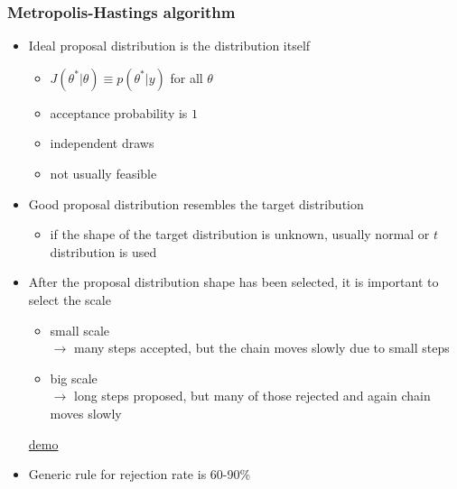 \documentclass[10pt]{beamer}
\begin{document}
\begin{frame}

\frametitle{ Metropolis-Hastings algorithm}

  \begin{itemize}
  \item Ideal proposal distribution is the distribution itself
    \begin{itemize}
    \item $J(\theta^{*}|\theta)\equiv p(\theta^{*}|y)$ for all
      $\theta$
    \item acceptance probability is $1$
    \item independent draws
    \item not usually feasible
    \end{itemize}
  \item<2-> Good proposal distribution resembles the target distribution
    \begin{itemize}
    \item if the shape of the target distribution is unknown, usually
      normal or $t$ distribution is used
    \end{itemize}
  \item<3-> After the proposal distribution shape has been selected, it is important to select the scale
    \begin{itemize}
    \item small scale \\$\rightarrow$ many steps accepted, but the chain moves slowly due to small steps
    \item big scale \\$\rightarrow$ long steps proposed, but many of
      those rejected and again chain moves slowly
    \end{itemize}
    \begin{center}
  \href{https://chi-feng.github.io/mcmc-demo/app.html?algorithm=RandomWalkMH&target=standard}{demo}
  \end{center}
  \item<4-> Generic rule for rejection rate is 60-90\% %
\end{itemize}

\end{frame}
\end{document}

